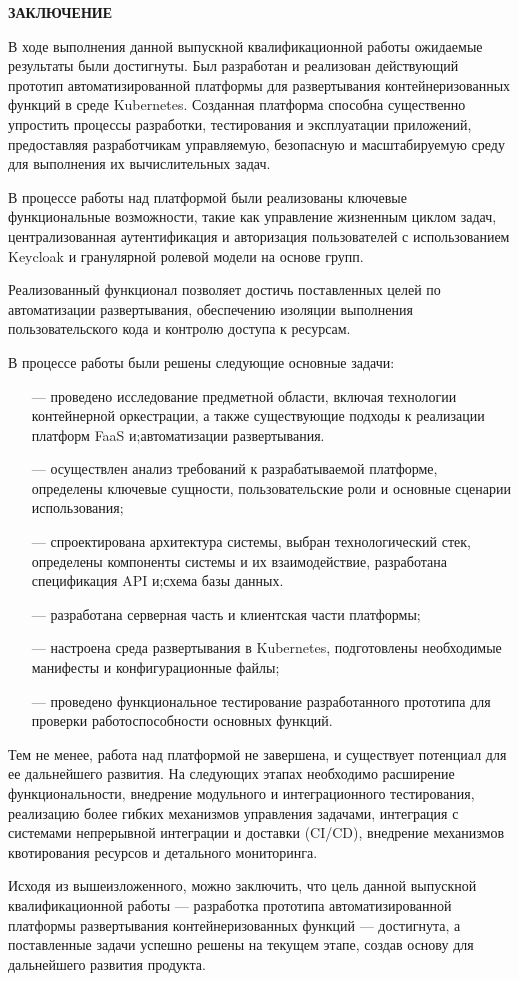 \newpage
\begin{center}
  \textbf{\large ЗАКЛЮЧЕНИЕ}
\end{center}

В ходе выполнения данной выпускной квалификационной работы ожидаемые результаты были достигнуты. Был разработан и реализован действующий прототип автоматизированной платформы для развертывания контейнеризованных функций в среде Kubernetes. Созданная платформа способна существенно упростить процессы разработки, тестирования и эксплуатации приложений, предоставляя разработчикам управляемую, безопасную и масштабируемую среду для выполнения их вычислительных задач.

В процессе работы над платформой были реализованы ключевые функциональные возможности, такие как управление жизненным циклом задач, централизованная аутентификация и авторизация пользователей с использованием Keycloak и гранулярной ролевой модели на основе групп.

Реализованный функционал позволяет достичь поставленных целей по автоматизации развертывания, обеспечению изоляции выполнения пользовательского кода и контролю доступа к ресурсам.

В процессе работы были решены следующие основные задачи:

\begin{itemize}
\item[---]проведено исследование предметной области, включая технологии контейнерной оркестрации, а также существующие подходы к реализации платформ FaaS и;автоматизации развертывания.
\item[---]осуществлен анализ требований к разрабатываемой платформе, определены ключевые сущности, пользовательские роли и основные сценарии использования;
\item[---]спроектирована архитектура системы, выбран технологический стек, определены компоненты системы и их взаимодействие, разработана спецификация API и;схема базы данных.
\item[---]разработана серверная часть и клиентская части платформы;
\item[---]настроена среда развертывания в Kubernetes, подготовлены необходимые манифесты и конфигурационные файлы;
\item[---]проведено функциональное тестирование разработанного прототипа для проверки работоспособности основных функций.
\end{itemize}

Тем не менее, работа над платформой не завершена, и существует потенциал для ее дальнейшего развития. На следующих этапах необходимо расширение функциональности, внедрение модульного и интеграционного тестирования, реализацию более гибких механизмов управления задачами, интеграция с системами непрерывной интеграции и доставки (CI/CD), внедрение механизмов квотирования ресурсов и детального мониторинга.

Исходя из вышеизложенного, можно заключить, что цель данной выпускной квалификационной работы — разработка прототипа автоматизированной платформы развертывания контейнеризованных функций — достигнута, а поставленные задачи успешно решены на текущем этапе, создав основу для дальнейшего развития продукта.